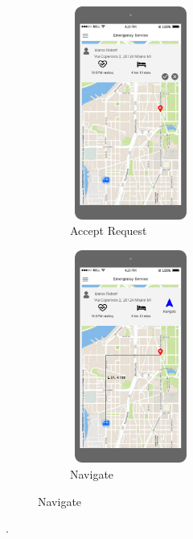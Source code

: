 \begin{figure}[H]
	\centering
	\begin{subfigure}[b]{0.4\textwidth}	
		\includegraphics[width=4cm,height=7cm]		{./Mockups/1-Ambulance.png}
      	\caption{Accept Request}
        \label{TrackMe_ambulance}
	 \end{subfigure}
     \begin{subfigure}[b]{0.4\textwidth}	
		\includegraphics[width=4cm,height=7cm]		{./Mockups/2-Ambulance.png}
      	\caption{Navigate}
        \label{TrackMe_navigate}
	 \end{subfigure}
\end{figure}
.\newline\newline

